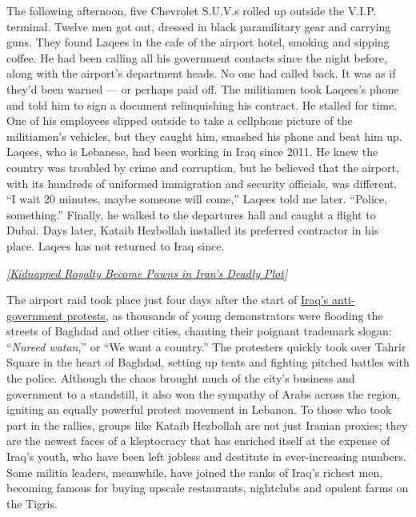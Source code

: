 The following afternoon, five Chevrolet S.U.V.s rolled up outside the
V.I.P. terminal. Twelve men got out, dressed in black paramilitary gear
and carrying guns. They found Laqees in the cafe of the airport hotel,
smoking and sipping coffee. He had been calling all his government
contacts since the night before, along with the airport's department
heads. No one had called back. It was as if they'd been warned --- or
perhaps paid off. The militiamen took Laqees's phone and told him to
sign a document relinquishing his contract. He stalled for time. One of
his employees slipped outside to take a cellphone picture of the
militiamen's vehicles, but they caught him, smashed his phone and beat
him up. Laqees, who is Lebanese, had been working in Iraq since 2011. He
knew the country was troubled by crime and corruption, but he believed
that the airport, with its hundreds of uniformed immigration and
security officials, was different. ``I wait 20 minutes, maybe someone
will come,'' Laqees told me later. ``Police, something.'' Finally, he
walked to the departures hall and caught a flight to Dubai. Days later,
Kataib Hezbollah installed its preferred contractor in his place. Laqees
has not returned to Iraq since.

\emph{\href{https://www.nytimes3xbfgragh.onion/2018/03/14/magazine/how-a-ransom-for-royal-falconers-reshaped-the-middle-east.html}{{[}Kidnapped
Royalty Become Pawns in Iran's Deadly Plot{]}}}

The airport raid took place just four days after the start of
\href{https://www.nytimes3xbfgragh.onion/2019/10/02/world/middleeast/iraq-corruption-protests.html}{Iraq's
anti-government protests}, as thousands of young demonstrators were
flooding the streets of Baghdad and other cities, chanting their
poignant trademark slogan: ``\emph{Nureed watan},'' or ``We want a
country.'' The protesters quickly took over Tahrir Square in the heart
of Baghdad, setting up tents and fighting pitched battles with the
police. Although the chaos brought much of the city's business and
government to a standstill, it also won the sympathy of Arabs across the
region, igniting an equally powerful protest movement in Lebanon. To
those who took part in the rallies, groups like Kataib Hezbollah are not
just Iranian proxies; they are the newest faces of a kleptocracy that
has enriched itself at the expense of Iraq's youth, who have been left
jobless and destitute in ever-increasing numbers. Some militia leaders,
meanwhile, have joined the ranks of Iraq's richest men, becoming famous
for buying upscale restaurants, nightclubs and opulent farms on the
Tigris.

